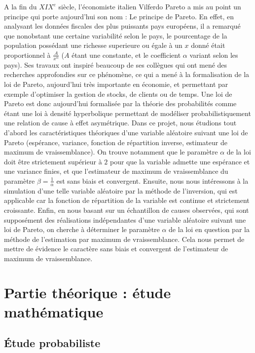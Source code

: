 \documentclass{article}
\begin{document}
A la fin du $XIX^{e}$ siècle, l'économiste italien Vilferdo Pareto a mis au point un principe qui porte aujourd'hui son nom : Le principe de Pareto.
En effet, en analysant les données fiscales des plus puissants pays européens, il a remarqué que nonobstant une certaine variabilité selon le pays, le pourcentage de la population possédant une richesse superieure ou égale à un $x$ donné était proportionnel à $\frac{A}{x^{\alpha}}$ ($A$ étant une constante, et le coefficient $\alpha$ variant selon les pays).
Ses travaux ont inspiré beaucoup de ses collègues qui ont mené des recherches approfondies sur ce phénomène, ce qui a mené à la formalisation de la loi de Pareto, aujourd'hui très importante en économie, et permettant par exemple d'optimiser la gestion de stocks, de clients ou de temps.
Une loi de Pareto est donc aujourd'hui formalisée par la théorie des probabilités comme étant une loi à densité hyperbolique permettant de modéliser probabilistiquement une relation de cause à effet asymétrique.
Dans ce projet, nous étudions tout d'abord les caractéristiques théoriques d'une variable aléatoire suivant une loi de Pareto (espérance, variance, fonction de répartition inverse, estimateur de maximum de vraissemblance). On trouve notamment que le paramètre $\alpha$ de la loi doit être strictement supérieur à $2$ pour que la variable admette une espérance et une variance finies, et que l'estimateur de maximum de vraissemblance du paramètre $\beta=\frac{1}{\alpha}$ est sans biais et convergent.
Ensuite, nous nous intéressons à la simulation d'une telle variable aléatoire par la méthode de l'inversion, qui est applicable car la fonction de répartition de la variable est continue et strictement croissante.
Enfin, en nous basant sur un échantillon de causes observées, qui sont supposément des réalisations indépendantes d'une variable aléatoire suivant une loi de Pareto, on cherche à déterminer le paramètre $\alpha$ de la loi en question par la méthode de l'estimation par maximum de vraissemblance. Cela nous permet de mettre de évidence le caractère sans biais et convergent de l'estimateur de maximum de vraissemblance. 

\pagebreak

\section{Partie théorique : étude mathématique}

\subsection{Étude probabiliste}
\end{document}
